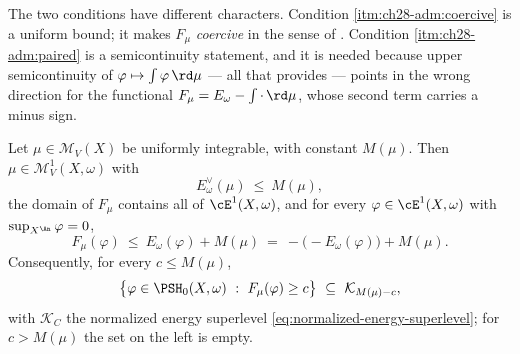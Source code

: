 The two conditions have different characters.  Condition
\cref{itm:ch28-adm:coercive} is a uniform bound; it makes $F_\mu$
\emph{coercive} in the sense of .  Condition
\cref{itm:ch28-adm:paired} is a semicontinuity statement, and it is needed
because upper semicontinuity of $\varphi\mapsto\int\varphi\,\rd\mu$ --- all
that  provides --- points in the wrong direction for
the functional $F_\mu=E_\omega-\int\cdot\,\rd\mu$, whose second term
carries a minus sign.

\begin{lemma}
\label{lem:ch28-coercivity}
Let $\mu\in\mathcal M_V(X)$ be uniformly integrable, with constant
$M(\mu)$.  Then $\mu\in\mathcal M^1_V(X,\omega)$ with
\begin{equation}
\label{eq:ch28-dual-energy-bound-M}
 E^\vee_\omega(\mu)\ \leq\ M(\mu),
\end{equation}
the domain of $F_\mu$ contains all of $\cE^1(X,\omega)$, and for every
$\varphi\in\cE^1(X,\omega)$ with $\sup_{X^{\An}}\varphi=0$,
\begin{equation}
\label{eq:ch28-coercive-inequality}
 F_\mu(\varphi)\ \leq\ E_\omega(\varphi)+M(\mu)
 \ =\ -\bigl(-E_\omega(\varphi)\bigr)+M(\mu).
\end{equation}
Consequently, for every $c\leq M(\mu)$,
\begin{equation}
\label{eq:ch28-sublevel-inclusion}
 \bigl\{\varphi\in\PSH_0(X,\omega)\ :\ F_\mu(\varphi)\geq c\bigr\}
 \ \subseteq\ \mathcal K_{M(\mu)-c},
\end{equation}
with $\mathcal K_C$ the normalized energy superlevel
\eqref{eq:normalized-energy-superlevel}; for $c>M(\mu)$ the set on the
left is empty.
\end{lemma}

